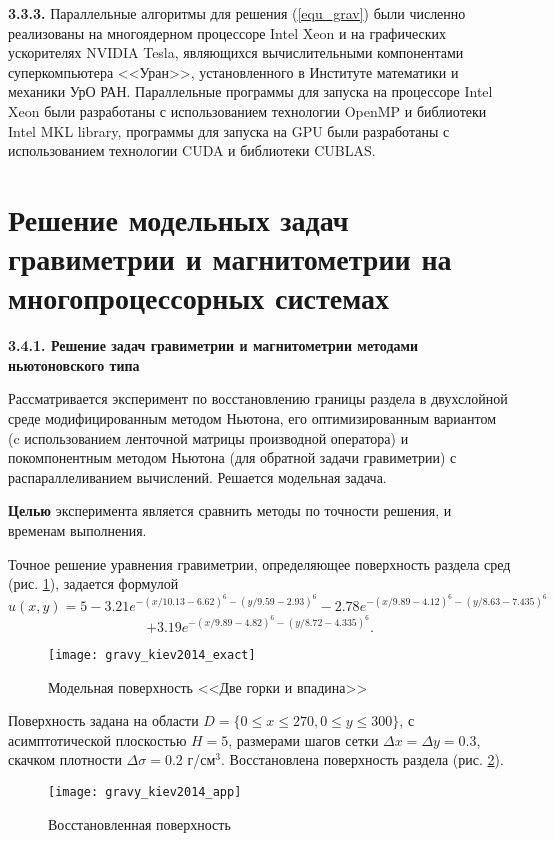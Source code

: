 {\bfseries 3.3.3.} Параллельные алгоритмы для решения (\ref{equ_grav}) были численно реализованы на многоядерном процессоре Intel Xeon и на графических ускорителях NVIDIA Tesla, являющихся вычислительными компонентами суперкомпьютера <<Уран>>, установленного в Институте математики и механики УрО РАН. Параллельные программы для запуска на процессоре Intel Xeon были разработаны с использованием технологии OpenMP и библиотеки Intel MKL library, программы для запуска на GPU были разработаны с использованием технологии CUDA и библиотеки CUBLAS. 

\newpage
\section{Решение модельных задач гравиметрии и магнитометрии на многопроцессорных системах}

{\bfseries 3.4.1. Решение задач гравиметрии и магнитометрии методами ньютоновского типа} 

Рассматривается эксперимент по восстановлению границы раздела в двухслойной среде модифицированным методом Ньютона, его оптимизированным вариантом (c использованием ленточной матрицы производной оператора) и покомпонентным методом Ньютона (для обратной задачи гравиметрии) с распараллеливанием вычислений. Решается модельная задача. 

{\bfseries Целью} эксперимента является сравнить методы по точности решения, и временам выполнения.

Точное решение уравнения гравиметрии, определяющее поверхность раздела сред (рис. \ref{fig:gravy_kiev2014_exact}), задается формулой
$$\hat{u}(x,y)=5-3.21e^{-(x/10.13-6.62)^6-(y/9.59-2.93)^6}-2.78e^{-(x/9.89-4.12)^6-(y/8.63-7.435)^6}$$ 
\begin{equation}\label{exact_exp3.4.1}
+3.19e^{-(x/9.89-4.82)^6-(y/8.72-4.335)^6}.
\end{equation}
\begin{figure}[h]
	\centering
	\texttt{[image: gravy\_kiev2014\_exact]}
	\caption{Модельная поверхность <<Две горки и впадина>>}
	\label{fig:gravy_kiev2014_exact}
\end{figure}
Поверхность задана на области $D=\{0\le x\le 270, 0\le y\le 300\}$, с асимптотической плоскостью $H=5$, размерами шагов сетки $\Delta x=\Delta y=0.3$, скачком плотности $\Delta\sigma=0.2$ г/см$^3$. Восстановлена поверхность раздела (рис. \ref{fig:gravy_kiev2014_app}).
\begin{figure}[h]
	\centering
	\texttt{[image: gravy\_kiev2014\_app]}
	\caption{Восстановленная поверхность}
	\label{fig:gravy_kiev2014_app}
\end{figure}


